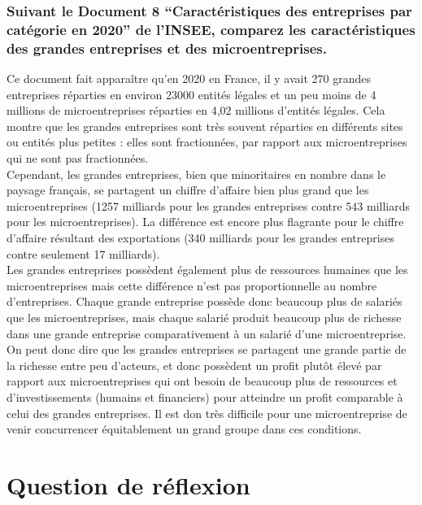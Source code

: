 \documentclass[11pt,a4paper,multicol]{article}
\begin{document}
\section{Suivant le Document 8 ``Caractéristiques des entreprises par catégorie en 2020'' de l'INSEE, comparez les caractéristiques des grandes entreprises et des microentreprises.}
Ce document fait apparaître qu'en 2020 en France, il y avait 270 grandes entreprises réparties en environ 23000 entités légales et un peu moins de 4 millions de microentreprises réparties en 4,02 millions d'entités légales. Cela montre que les grandes entreprises sont très souvent réparties en différents sites ou entités plus petites : elles sont fractionnées, par rapport aux microentreprises qui ne sont pas fractionnées.\\
Cependant, les grandes entreprises, bien que minoritaires en nombre dans le paysage français, se partagent un chiffre d'affaire bien plus grand que les microentreprises (1257 milliards pour les grandes entreprises contre 543 milliards pour les microentreprises). La différence est encore plus flagrante pour le chiffre d'affaire résultant des exportations (340 milliards pour les grandes entreprises contre seulement 17 milliards).\\
Les grandes entreprises possèdent également plus de ressources humaines que les microentreprises mais cette différence n'est pas proportionnelle au nombre d'entreprises. Chaque grande entreprise possède donc beaucoup plus de salariés que les microentreprises, mais chaque salarié produit beaucoup plus de richesse dans une grande entreprise comparativement à un salarié d'une microentreprise.\\
On peut donc dire que les grandes entreprises se partagent une grande partie de la richesse entre peu d'acteurs, et donc possèdent un profit plutôt élevé par rapport aux microentreprises qui ont besoin de beaucoup plus de ressources et d'investissements (humains et financiers) pour atteindre un profit comparable à celui des grandes entreprises. Il est don très difficile pour une microentreprise de venir concurrencer équitablement un grand groupe dans ces conditions.


\part*{Question de réflexion}
\end{document}
